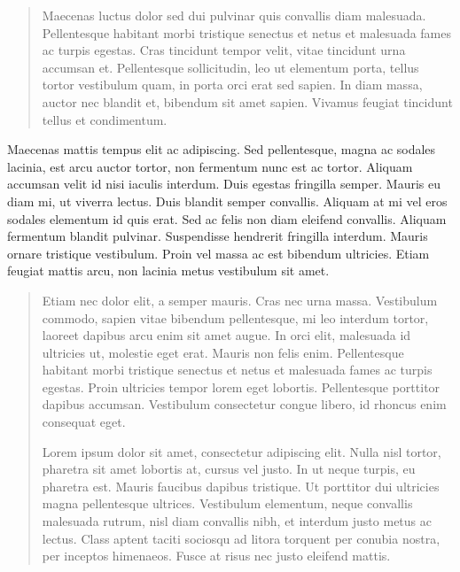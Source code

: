 \begin{quote}
Maecenas luctus dolor sed dui pulvinar quis convallis diam malesuada.
Pellentesque habitant morbi tristique senectus et netus et malesuada fames ac turpis egestas.
Cras tincidunt tempor velit, vitae tincidunt urna accumsan et.
Pellentesque sollicitudin, leo ut elementum porta, tellus tortor vestibulum quam, in porta orci erat sed sapien.
In diam massa, auctor nec blandit et, bibendum sit amet sapien.
Vivamus feugiat tincidunt tellus et condimentum.
\end{quote}

Maecenas mattis tempus elit ac adipiscing.
Sed pellentesque, magna ac sodales lacinia, est arcu auctor tortor, non fermentum nunc est ac tortor.
Aliquam accumsan velit id nisi iaculis interdum.
Duis egestas fringilla semper.
Mauris eu diam mi, ut viverra lectus.
Duis blandit semper convallis.
Aliquam at mi vel eros sodales elementum id quis erat.
Sed ac felis non diam eleifend convallis.
Aliquam fermentum blandit pulvinar.
Suspendisse hendrerit fringilla interdum.
Mauris ornare tristique vestibulum.
Proin vel massa ac est bibendum ultricies.
Etiam feugiat mattis arcu, non lacinia metus vestibulum sit amet.

\begin{quotation}
Etiam nec dolor elit, a semper mauris.
Cras nec urna massa.
Vestibulum commodo, sapien vitae bibendum pellentesque, mi leo interdum tortor, laoreet dapibus arcu enim sit amet augue.
In orci elit, malesuada id ultricies ut, molestie eget erat.
Mauris non felis enim.
Pellentesque habitant morbi tristique senectus et netus et malesuada fames ac turpis egestas.
Proin ultricies tempor lorem eget lobortis.
Pellentesque porttitor dapibus accumsan.
Vestibulum consectetur congue libero, id rhoncus enim consequat eget.

Lorem ipsum dolor sit amet, consectetur adipiscing elit.
Nulla nisl tortor, pharetra sit amet lobortis at, cursus vel justo.
In ut neque turpis, eu pharetra est.
Mauris faucibus dapibus tristique.
Ut porttitor dui ultricies magna pellentesque ultrices.
Vestibulum elementum, neque convallis malesuada rutrum, nisl diam convallis nibh, et interdum justo metus ac lectus.
Class aptent taciti sociosqu ad litora torquent per conubia nostra, per inceptos himenaeos.
Fusce at risus nec justo eleifend mattis.
\end{quotation}

